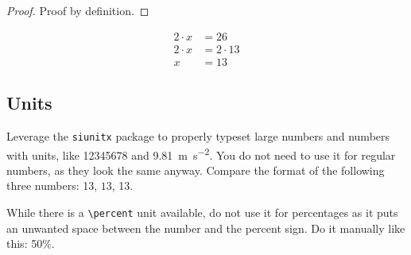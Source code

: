 \begin{proof}
	Proof by definition.
\end{proof}

\begin{example}
	\begin{align*}
		2 \cdot x &= 26\\
		2 \cdot x &= 2 \cdot 13\\
		x &= 13
	\end{align*}
	\label{ex:some_example}
\end{example}

\subsection{Units}

Leverage the \texttt{siunitx} package to properly typeset large numbers and numbers with units, like \num{12345678} and \SI{9.81}{\meter\per\second^2}.
You do not need to use it for regular numbers, as they look the same anyway.
Compare the format of the following three numbers: 13, $13$, \num{13}.

While there is a \texttt{\textbackslash{}percent} unit available, do not use it for percentages as it puts an unwanted space between the number and the percent sign.
Do it manually like this: 50\%.

